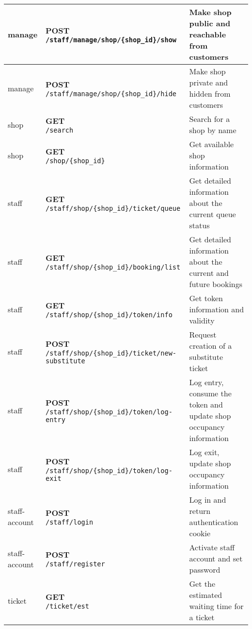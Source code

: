 \begin{tabularx}{\textwidth}{|p{}|l|X|}
manage & \makecell{\textbf{POST} \\ \texttt{/staff/manage/shop/\{shop\_id\}/show}}  & Make shop public and reachable from customers \\\hline
manage & \makecell{\textbf{POST} \\ \texttt{/staff/manage/shop/\{shop\_id\}/hide}}  & Make shop private and hidden from customers \\\hline
shop & \makecell{\textbf{GET} \\ \texttt{/search}}  & Search for a shop by name \\\hline
shop & \makecell{\textbf{GET} \\ \texttt{/shop/\{shop\_id\}}}  & Get available shop information \\\hline
staff & \makecell{\textbf{GET} \\ \texttt{/staff/shop/\{shop\_id\}/ticket/queue}}  & Get detailed information about the current queue status \\\hline
staff & \makecell{\textbf{GET} \\ \texttt{/staff/shop/\{shop\_id\}/booking/list}}  & Get detailed information about the current and future bookings \\\hline
staff & \makecell{\textbf{GET} \\ \texttt{/staff/shop/\{shop\_id\}/token/info}}  & Get token information and validity \\\hline
staff & \makecell{\textbf{POST} \\ \texttt{/staff/shop/\{shop\_id\}/ticket/new-substitute}}  & Request creation of a substitute ticket \\\hline
staff & \makecell{\textbf{POST} \\ \texttt{/staff/shop/\{shop\_id\}/token/log-entry}}  & Log entry, consume the token and update shop occupancy information \\\hline
staff & \makecell{\textbf{POST} \\ \texttt{/staff/shop/\{shop\_id\}/token/log-exit}}  & Log exit, update shop occupancy information \\\hline
staff-account & \makecell{\textbf{POST} \\ \texttt{/staff/login}}  & Log in and return authentication cookie \\\hline
staff-account & \makecell{\textbf{POST} \\ \texttt{/staff/register}}  & Activate staff account and set password \\\hline
ticket & \makecell{\textbf{GET} \\ \texttt{/ticket/est}}  & Get the estimated waiting time for a ticket \\\hline

\end{tabularx}
